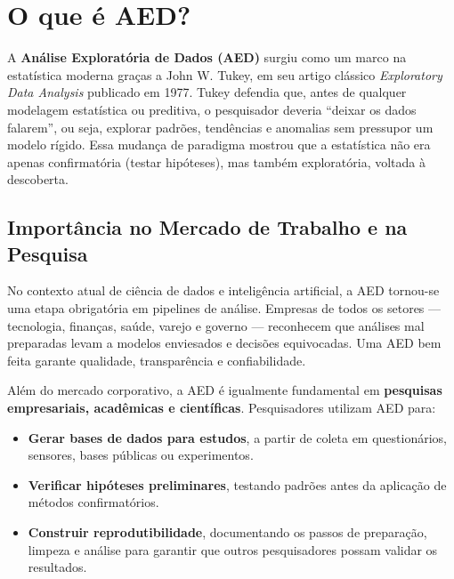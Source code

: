 \chapter{O que é AED?}

A \textbf{Análise Exploratória de Dados (AED)} surgiu como um marco na estatística moderna graças a John W. Tukey, em seu artigo clássico \textit{Exploratory Data Analysis} publicado em 1977. Tukey defendia que, antes de qualquer modelagem estatística ou preditiva, o pesquisador deveria “deixar os dados falarem”, ou seja, explorar padrões, tendências e anomalias sem pressupor um modelo rígido. Essa mudança de paradigma mostrou que a estatística não era apenas confirmatória (testar hipóteses), mas também exploratória, voltada à descoberta.

\section{Importância no Mercado de Trabalho e na Pesquisa}

No contexto atual de ciência de dados e inteligência artificial, a AED tornou-se uma etapa obrigatória em pipelines de análise. Empresas de todos os setores — tecnologia, finanças, saúde, varejo e governo — reconhecem que análises mal preparadas levam a modelos enviesados e decisões equivocadas. Uma AED bem feita garante qualidade, transparência e confiabilidade. 

Além do mercado corporativo, a AED é igualmente fundamental em \textbf{pesquisas empresariais, acadêmicas e científicas}. Pesquisadores utilizam AED para:
\begin{itemize}[leftmargin=*]
  \item \textbf{Gerar bases de dados para estudos}, a partir de coleta em questionários, sensores, bases públicas ou experimentos.
  \item \textbf{Verificar hipóteses preliminares}, testando padrões antes da aplicação de métodos confirmatórios.
  \item \textbf{Construir reprodutibilidade}, documentando os passos de preparação, limpeza e análise para garantir que outros pesquisadores possam validar os resultados.
\end{itemize}

